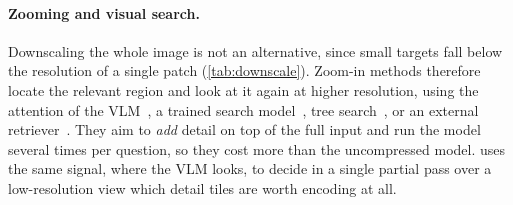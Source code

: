 \paragraph{Zooming and visual search.}
Downscaling the whole image is not an alternative, since small targets fall below the resolution of a
single patch (\cref{tab:downscale}). Zoom-in methods therefore locate the relevant region and look at it again at higher
resolution, using the attention of the VLM~\cite{vicrop}, a trained search model~\cite{vstar}, tree
search~\cite{zoomeye,dyfo}, or an external retriever~\cite{rap}. They aim to \emph{add} detail on top of
the full input and run the model several times per question, so they cost more than the uncompressed
model. \method uses the same signal, \ie where the VLM looks, to decide in a single partial pass over a
low-resolution view which detail tiles are worth encoding at all.
